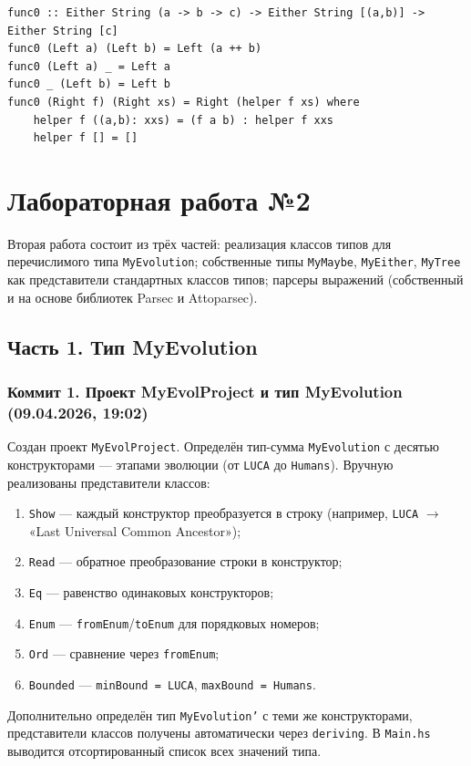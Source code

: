 \documentclass[a4paper, final]{article}
\newenvironment{code}{\captionsetup{type=listing}}{}
\begin{document}
\begin{code}
\begin{verbatim}
func0 :: Either String (a -> b -> c) -> Either String [(a,b)] -> Either String [c]
func0 (Left a) (Left b) = Left (a ++ b)
func0 (Left a) _ = Left a
func0 _ (Left b) = Left b
func0 (Right f) (Right xs) = Right (helper f xs) where
    helper f ((a,b): xxs) = (f a b) : helper f xxs
    helper f [] = []
\end{verbatim}
\caption*{Листинг 2: func0 — применение Either-функции к списку пар Either}
\end{code}

\section{Лабораторная работа №2}

Вторая работа состоит из трёх частей: реализация классов типов для
перечислимого типа \texttt{MyEvolution}; собственные типы \texttt{MyMaybe},
\texttt{MyEither}, \texttt{MyTree} как представители стандартных классов
типов; парсеры выражений (собственный и на основе библиотек Parsec и
Attoparsec).

\subsection{Часть 1. Тип MyEvolution}

\subsubsection{Коммит 1. Проект MyEvolProject и тип MyEvolution (09.04.2026, 19:02)}

Создан проект \texttt{MyEvolProject}. Определён тип-сумма
\texttt{MyEvolution} с десятью конструкторами — этапами эволюции (от
\texttt{LUCA} до \texttt{Humans}). Вручную реализованы представители классов:
\begin{enumerate}[label=\alph*),leftmargin=*]
  \item \texttt{Show} — каждый конструктор преобразуется в строку (например,
        \texttt{LUCA} $\to$ «Last Universal Common Ancestor»);
  \item \texttt{Read} — обратное преобразование строки в конструктор;
  \item \texttt{Eq} — равенство одинаковых конструкторов;
  \item \texttt{Enum} — \texttt{fromEnum}/\texttt{toEnum} для порядковых
        номеров;
  \item \texttt{Ord} — сравнение через \texttt{fromEnum};
  \item \texttt{Bounded} — \texttt{minBound = LUCA}, \texttt{maxBound = Humans}.
\end{enumerate}
Дополнительно определён тип \texttt{MyEvolution'} с теми же конструкторами,
представители классов получены автоматически через \texttt{deriving}. В
\texttt{Main.hs} выводится отсортированный список всех значений типа.
\end{document}
